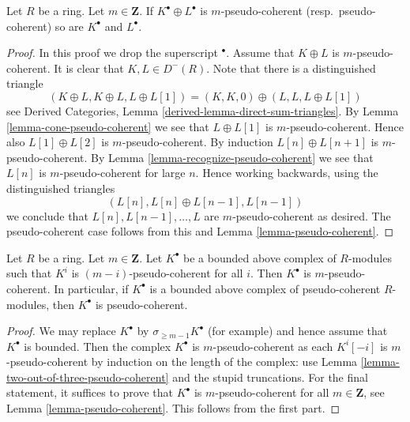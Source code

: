 \begin{lemma}
\label{lemma-summands-pseudo-coherent}
Let $R$ be a ring. Let $m \in \mathbf{Z}$. If $K^\bullet \oplus L^\bullet$
is $m$-pseudo-coherent (resp.\ pseudo-coherent)
so are $K^\bullet$ and $L^\bullet$.
\end{lemma}

\begin{proof}
In this proof we drop the superscript ${}^\bullet$.
Assume that $K \oplus L$ is $m$-pseudo-coherent.
It is clear that $K, L \in D^{-}(R)$.
Note that there is a distinguished triangle
$$
(K \oplus L, K \oplus L, L \oplus L[1]) =
(K, K, 0) \oplus (L, L, L \oplus L[1])
$$
see
Derived Categories, Lemma \ref{derived-lemma-direct-sum-triangles}.
By
Lemma \ref{lemma-cone-pseudo-coherent}
we see that $L \oplus L[1]$ is $m$-pseudo-coherent.
Hence also $L[1] \oplus L[2]$ is $m$-pseudo-coherent.
By induction $L[n] \oplus L[n + 1]$ is $m$-pseudo-coherent.
By
Lemma \ref{lemma-recognize-pseudo-coherent}
we see that $L[n]$ is $m$-pseudo-coherent for large $n$.
Hence working backwards, using the distinguished triangles
$$
(L[n], L[n] \oplus L[n - 1], L[n - 1])
$$
we conclude that $L[n], L[n - 1], \ldots, L$ are $m$-pseudo-coherent
as desired. The pseudo-coherent case follows from this and
Lemma \ref{lemma-pseudo-coherent}.
\end{proof}

\begin{lemma}
\label{lemma-complex-pseudo-coherent-modules}
Let $R$ be a ring. Let $m \in \mathbf{Z}$. Let $K^\bullet$ be a bounded
above complex of $R$-modules such that $K^i$ is $(m - i)$-pseudo-coherent
for all $i$. Then $K^\bullet$ is $m$-pseudo-coherent.
In particular, if $K^\bullet$ is a bounded above complex of
pseudo-coherent $R$-modules, then $K^\bullet$ is pseudo-coherent.
\end{lemma}

\begin{proof}
We may replace $K^\bullet$ by $\sigma_{\geq m - 1}K^\bullet$ (for example) and
hence assume that $K^\bullet$ is bounded.
Then the complex $K^\bullet$ is $m$-pseudo-coherent as each
$K^i[-i]$ is $m$-pseudo-coherent by induction on the length of the
complex: use
Lemma \ref{lemma-two-out-of-three-pseudo-coherent}
and the stupid truncations.
For the final statement, it suffices to prove that
$K^\bullet$ is $m$-pseudo-coherent for all $m \in \mathbf{Z}$, see
Lemma \ref{lemma-pseudo-coherent}.
This follows from the first part.
\end{proof}

